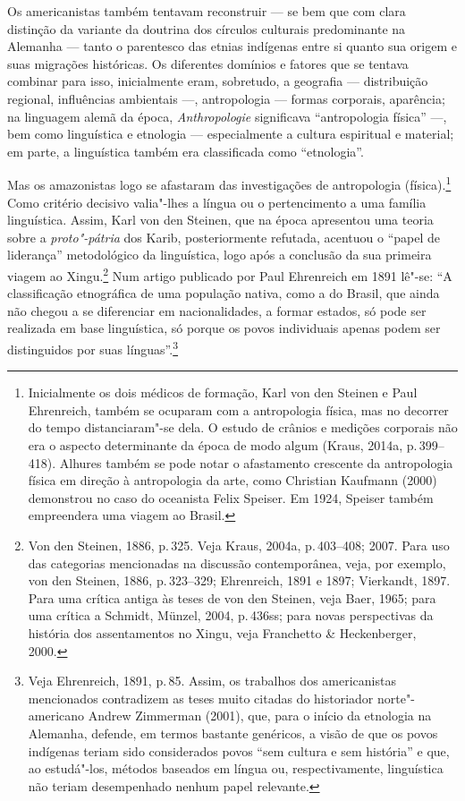 Os americanistas também tentavam reconstruir --- se bem que com clara
distinção da variante da doutrina dos círculos culturais predominante na
Alemanha --- tanto o parentesco das etnias indígenas entre si quanto sua
origem e suas migrações históricas. Os diferentes domínios e fatores que
se tentava combinar para isso, inicialmente eram, sobretudo, a
geografia --- distribuição regional, influências ambientais ---, antropologia --- formas corporais, aparência; na linguagem alemã da época,
\textit{Anthropologie} significava ``antropologia física'' ---,
bem como linguística e etnologia --- especialmente a
cultura espiritual e material; em parte, a linguística também era
classificada como ``etnologia''.

Mas os amazonistas logo se afastaram das investigações de antropologia
(física).\footnote{Inicialmente os dois médicos de formação, Karl von
  den Steinen e Paul Ehrenreich, também se ocuparam com a antropologia
  física, mas no decorrer do tempo distanciaram"-se dela. O estudo de
  crânios e medições corporais não era o aspecto determinante da época
  de modo algum (Kraus, 2014a, p.\,399--418). Alhures também se pode notar
  o afastamento crescente da antropologia física em direção à
  antropologia da arte, como Christian Kaufmann (2000) demonstrou no
  caso do oceanista Felix Speiser. Em 1924, Speiser também
  empreendera uma viagem ao Brasil.} Como critério decisivo valia"-lhes a
língua ou o pertencimento a uma família linguística. Assim, Karl von den
Steinen, que na época apresentou uma teoria sobre a \textit{proto"-pátria} dos Karib, posteriormente refutada, acentuou o
``papel de liderança'' metodológico da linguística, logo após a
conclusão da sua primeira viagem ao Xingu.\footnote{Von den Steinen,
  1886, p.\,325. Veja Kraus, 2004a, p.\,403--408; 2007. Para uso das
  categorias mencionadas na discussão contemporânea, veja, por exemplo,
  von den Steinen, 1886, p.\,323--329; Ehrenreich, 1891 e 1897; Vierkandt,
  1897. Para uma crítica antiga às teses de von den Steinen, veja Baer,
  1965; para uma crítica a Schmidt, Münzel, 2004, p.\,436ss; para
  novas perspectivas da história dos assentamentos no Xingu, veja
  Franchetto \& Heckenberger, 2000.} Num artigo publicado por Paul
Ehrenreich em 1891 lê"-se: ``A classificação etnográfica de uma população
nativa, como a do Brasil, que ainda não chegou a se diferenciar em
nacionalidades, a formar estados, só pode ser realizada em base
linguística, só porque os povos individuais apenas podem ser
distinguidos por suas línguas''.\footnote{Veja Ehrenreich, 1891, p.\,85. Assim,
  os trabalhos dos americanistas mencionados contradizem as teses muito
  citadas do historiador norte"-americano Andrew Zimmerman (2001), que,
  para o início da etnologia na Alemanha, defende, em termos bastante
  genéricos, a visão de que os povos indígenas teriam sido considerados
  povos ``sem cultura e sem história'' e que, ao estudá"-los, métodos
  baseados em língua ou, respectivamente, linguística não teriam
  desempenhado nenhum papel relevante.}

